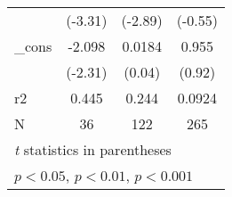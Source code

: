 \begin{table}[htbp]
\begin{tabular}{l*{3}{c}}
            &     (-3.31)         &     (-2.89)         &     (-0.55)         \\
[1em]
\_cons      &      -2.098\sym{*}  &      0.0184         &       0.955         \\
            &     (-2.31)         &      (0.04)         &      (0.92)         \\
\hline
r2          &       0.445         &       0.244         &      0.0924         \\
N           &          36         &         122         &         265         \\
\hline\hline
\multicolumn{4}{l}{\footnotesize \textit{t} statistics in parentheses}\\
\multicolumn{4}{l}{\footnotesize \sym{*} \(p<0.05\), \sym{**} \(p<0.01\), \sym{***} \(p<0.001\)}\\
\end{tabular}
\end{table}
